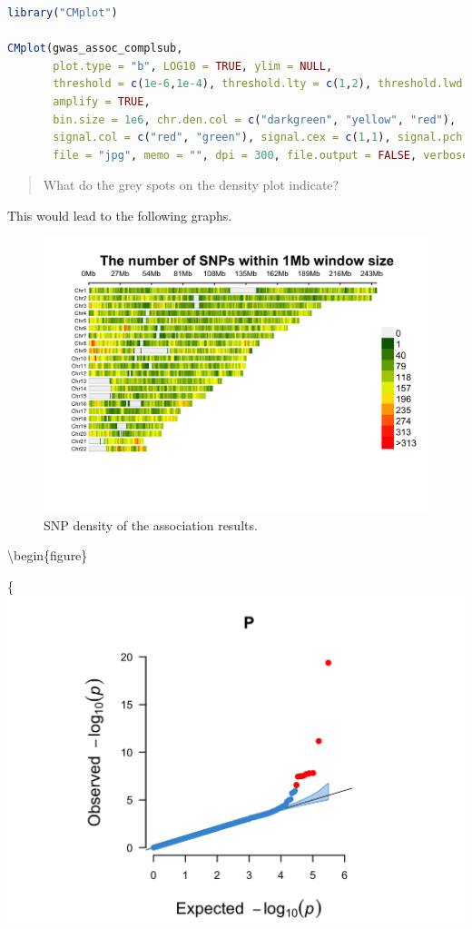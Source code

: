 \documentclass[
]{book}
\begin{document}
\begin{lstlisting}[language=R]
library("CMplot")

CMplot(gwas_assoc_complsub,
       plot.type = "b", LOG10 = TRUE, ylim = NULL,
       threshold = c(1e-6,1e-4), threshold.lty = c(1,2), threshold.lwd = c(1,1), threshold.col = c("black", "grey"),
       amplify = TRUE,
       bin.size = 1e6, chr.den.col = c("darkgreen", "yellow", "red"),
       signal.col = c("red", "green"), signal.cex = c(1,1), signal.pch = c(19,19),
       file = "jpg", memo = "", dpi = 300, file.output = FALSE, verbose = TRUE)
\end{lstlisting}

\begin{quote}
What do the grey spots on the density plot indicate?
\end{quote}

This would lead to the following graphs.

\begin{figure}

{\centering \includegraphics[width=18.67in]{img/show-cmplot-all-density} 

}

\caption{SNP density of the association results.}\label{fig:show-cmplot-all-density}
\end{figure}

\textbackslash begin\{figure\}

\{\centering \includegraphics[width=18.67in]{img/show-cmplot-all-qq}
\end{document}
